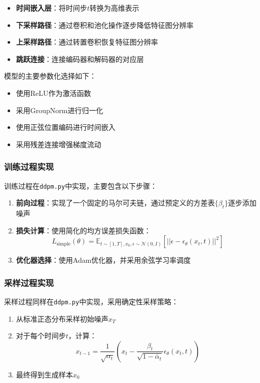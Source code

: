 \documentclass{ctexart}
\begin{document}
\begin{itemize}
    \item \textbf{时间嵌入层}：将时间步$t$转换为高维表示
    \item \textbf{下采样路径}：通过卷积和池化操作逐步降低特征图分辨率
    \item \textbf{上采样路径}：通过转置卷积恢复特征图分辨率
    \item \textbf{跳跃连接}：连接编码器和解码器的对应层
\end{itemize}

\noindent
模型的主要参数化选择如下：
\begin{itemize}
    \item 使用ReLU作为激活函数
    \item 采用GroupNorm进行归一化
    \item 使用正弦位置编码进行时间嵌入
    \item 采用残差连接增强梯度流动
\end{itemize}

\subsubsection{训练过程实现}
\noindent
训练过程在\texttt{ddpm.py}中实现，主要包含以下步骤：

\begin{enumerate}
    \item \textbf{前向过程}：实现了一个固定的马尔可夫链，通过预定义的方差表$\{\beta_t\}$逐步添加噪声
    \item \textbf{损失计算}：使用简化的均方误差损失函数：
    \begin{equation}
        L_{\text{simple}}(\theta) = \mathbb{E}_{t \sim [1,T], x_0, \epsilon \sim \mathcal{N}(0,I)} \left[ ||\epsilon - \epsilon_\theta(x_t, t)||^2 \right]
    \end{equation}
    \item \textbf{优化器选择}：使用Adam优化器，并采用余弦学习率调度
\end{enumerate}

\subsubsection{采样过程实现}
\noindent
采样过程同样在\texttt{ddpm.py}中实现，采用确定性采样策略：

\begin{enumerate}
    \item 从标准正态分布采样初始噪声$x_T$
    \item 对于每个时间步$t$，计算：
    \begin{equation}
        x_{t-1} = \frac{1}{\sqrt{\alpha_t}}\left(x_t - \frac{\beta_t}{\sqrt{1-\bar{\alpha}_t}}\epsilon_\theta(x_t, t)\right)
    \end{equation}
    \item 最终得到生成样本$x_0$
\end{enumerate}
\end{document}
